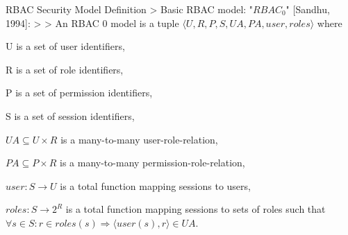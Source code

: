 \documentclass[a4paper]{article}
\begin{document}
\begin{multicols}{3}
    RBAC Security Model Definition
    > Basic RBAC model: "$RBAC_0$" [Sandhu, 1994]:
    >
    > An RBAC 0 model is a tuple $⟨U,R,P,S,UA,PA,user,roles⟩$ where
    \begin{itemize*}
        \item U is a set of user identifiers,
        \item R is a set of role identifiers,
        \item P is a set of permission identifiers,
        \item S is a set of session identifiers,
        \item $UA\subseteq U\times R$ is a many-to-many user-role-relation,
        \item $PA\subseteq P\times R$ is a many-to-many permission-role-relation,
        \item $user:S\rightarrow U$ is a total function mapping sessions to users,
        \item $roles:S\rightarrow 2^R$ is a total function mapping sessions to sets of roles such that $\forall s\in S:r\in roles(s)\Rightarrow ⟨user(s),r⟩\in UA$.
    \end{itemize*}


\end{multicols}
\end{document}

